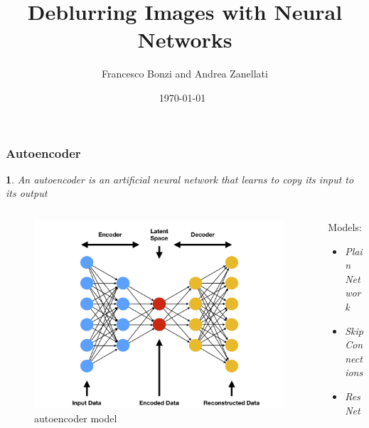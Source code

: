 \documentclass [handout] {beamer}
\title{Deblurring Images with Neural Networks}
\author{Francesco Bonzi and Andrea Zanellati}
\institute{Deep Learning Course Project \\
	\medskip
	\textit{prof. Andrea Asperti}
}
\date{\today\  \\ }
\newtheorem{formula}{}{}
\begin{document}
\begin{frame}
	\titlepage
\end{frame} %

\begin{frame}
	\frametitle{Autoencoder}
	\begin{formula}
		An autoencoder is an artificial neural network that learns to copy its input to its output
	\end{formula}
	\begin{columns}
		\begin{column}{0.4\textwidth}
			\begin{figure}[]
			\includegraphics[width=1.3\columnwidth]{autoencoder_model.png}
    			\caption{autoencoder model}
			\end{figure}
		\end{column}
		\begin{column}{0.4\textwidth}
			Models:
			\begin{itemize}
				\item \textit{Plain Network}
				\item \textit{Skip Connections}
				\item \textit{ResNet}
			\end{itemize}
		\end{column}
	\end{columns}
\end{frame}
\end{document}
